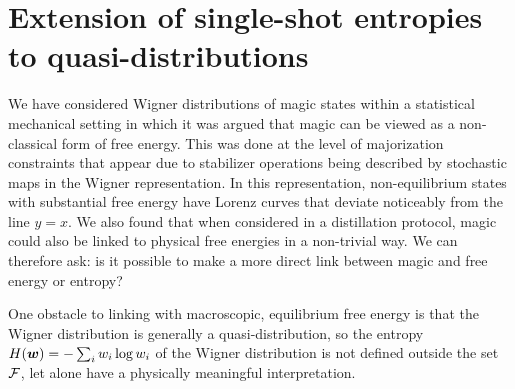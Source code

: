 \documentclass[pra,
aps,
twocolumn,
superscriptaddress,
groupedaddress,
nofootinbib,
reprint
]{revtex4-1}
\begin{document}
\section{Extension of single-shot entropies to quasi-distributions}\label{section:entropies}
We have considered Wigner distributions of magic states within a statistical mechanical setting in which it was argued that magic can be viewed as a non-classical form of free energy. This was done at the level of majorization constraints that appear due to stabilizer operations being described by stochastic maps in the Wigner representation. In this representation, non-equilibrium states with substantial free energy have Lorenz curves that deviate noticeably from the line $y=x$. We also found that when considered in a distillation protocol, magic could also be linked to physical free energies in a non-trivial way. We can therefore ask: is it possible to make a more direct link between magic and free energy or entropy?

One obstacle to linking with macroscopic, equilibrium free energy is that the Wigner distribution is generally a quasi-distribution, so the entropy $H(\boldsymbol{w}) = -\sum_i w_i \log w_i$ of the Wigner distribution is not defined outside the set ${\mathcal F}$, let alone have a physically meaningful interpretation.
 
\end{document}
